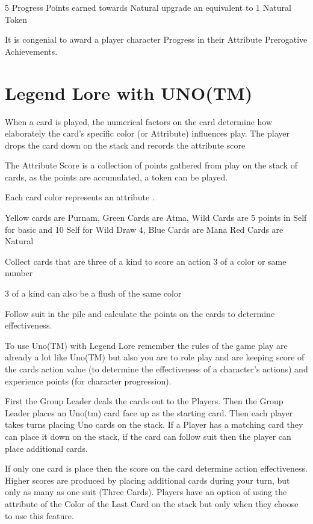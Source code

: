 \documentclass{article}
\begin{document}
5 Progress Points earned towards Natural upgrade an equivalent to 1 Natural Token

It is congenial to award a player character Progress in their Attribute Prerogative Achievements.

\section{Legend Lore with UNO(TM)}

When a card is played, the numerical factors on the card determine how elaborately the card's specific color (or Attribute) influences play. The player drops the card down on the stack and records the attribute score

The Attribute Score is a collection of points gathered from play on the stack of cards, as the points are accumulated, a token can be played.

Each card color represents an attribute .

Yellow cards are Purnam, Green Cards are Atma, Wild Cards are 5 points in Self for basic and 10 Self for Wild Draw 4, Blue Cards are Mana Red Cards are Natural

Collect cards that are three of a kind to score an action 3 of a color or same number

3 of a kind can also be a flush of the same color

Follow suit in the pile and calculate the points on the cards to determine effectiveness.

To use Uno(TM) with Legend Lore remember the rules of the game play are already a lot like Uno(TM) but also you are to role play and are keeping score of the cards action value (to determine the effectiveness of a character's actions) and experience points (for character progression).

First the Group Leader deals the cards out to the Players. Then the Group Leader places an Uno(tm) card face up as the starting card. Then each player takes turns placing Uno cards on the stack. If a Player has a matching card they can place it down  on the stack, if the card can follow suit then the player can place additional cards.

If only one card is place then the score on the card determine action effectiveness. Higher scores are produced by placing additional cards during your turn, but only as many as one suit (Three Cards). Players have an option of using the attribute of the Color of the Last Card on the stack but only when they choose to use this feature.
\end{document}
